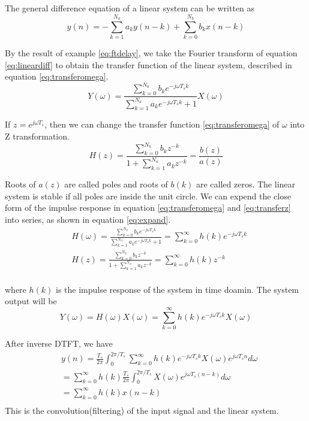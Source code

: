 The general difference equation of a linear system can be written as 
\begin{equation}
y(n) = - \sum_{k=1}^{N_a} a_k y(n-k) + \sum_{k=0}^{N_b} b_k x(n-k)
\label{eq:lineardiff}
\end{equation}

By the result of example \ref{eq:ftdelay}, we take the Fourier transform of equation \ref{eq:lineardiff}
to obtain the transfer function of the linear system, described in equation \ref{eq:transferomega}. 
\begin{equation}
Y(\omega) = \frac{\sum_{k=0}^{N_b}b_k e^{-j\omega T_s k}}{\sum_{k=1}^{N_a} a_k e^{-j\omega T_s k} + 1} X(\omega)
\label{eq:transferomega}
\end{equation}

If $z = e^{j\omega T_s}$, then we can change the transfer function \ref{eq:transferomega} of $\omega$ into
Z transformation. 
\begin{equation}
H(z) = \frac{\sum_{k=0}^{N_b}b_k z^{-k}}{1+\sum_{k=1}^{N_a}a_k z^{-k}} = \frac{b(z)}{a(z)}
\label{eq:transferz}
\end{equation} 

Roots of $a(z)$ are called poles and roots of $b(k)$ are called zeros. The linear system is 
stable if all poles are inside the unit circle. We can expend the close form of the impulse 
response in equation \ref{eq:transferomega} and \ref{eq:transferz} into series, 
as shown in equation \ref{eq:expand}.
\begin{equation}
\begin{aligned}
& H(\omega)=\frac{\sum_{k=0}^{N_b}b_k e^{-j\omega T_s k}}{\sum_{k=1}^{N_a} a_k e^{-j\omega T_s k} + 1}
=\sum_{k=0}^{\infty}h(k) e ^{-j\omega T_s k} \\
& H(z) = \frac{\sum_{k=0}^{N_b}b_k z^{-k}}{1+\sum_{k=1}^{N_a}a_k z^{-k}}  
=\sum_{k=0}^{\infty}h(k) z^{-k} \\
\end{aligned}
\label{eq:expand}
\end{equation} 

where $h(k)$ is the impulse response of the system in time doamin. The system output will be
\begin{equation}
Y(\omega) = H(\omega)X(\omega) = \sum_{k=0}^{\infty}h(k)e^{-j\omega T_s k} X(\omega)
\end{equation}

After inverse DTFT, we have
\begin{equation}
\begin{aligned}
& y(n)  = \frac{T_s}{2\pi}\int_{0}^{2\pi /T_s} \sum_{k=0}^{\infty}h(k)e^{-j\omega T_s k}X(\omega) e^{j\omega T_s n} d\omega \\
      & = \sum_{k=0}^{\infty} h(k) \frac{T_s}{2\pi}\int_{0}^{2\pi /T_s} X(\omega) e^{j\omega T_s (n-k)} d\omega\\
     & = \sum_{k=0}^{\infty} h(k) x(n-k) \\ 
\end{aligned}
\end{equation}
This is the convolution(filtering) of the input signal and the linear system. 

